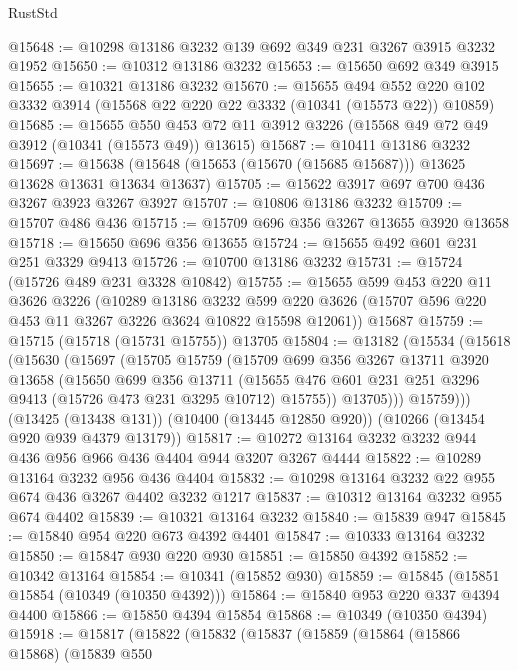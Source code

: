 \begin{lexlean}{RustStd}
\begin{coremodule}
@15648 := @10298 @13186 @3232 @139 @692 @349 @231 @3267 @3915 @3232 @1952
@15650 := @10312 @13186 @3232
@15653 := @15650 @692 @349 @3915
@15655 := @10321 @13186 @3232
@15670 := @15655
    @494
    @552
    @220
    @102
    @3332
    @3914
    (@15568 @22 @220 @22 @3332 (@10341 (@15573 @22)) @10859)
@15685 := @15655
    @550
    @453
    @72
    @11
    @3912
    @3226
    (@15568 @49 @72 @49 @3912 (@10341 (@15573 @49)) @13615)
@15687 := @10411 @13186 @3232
@15697 := @15638 (@15648 (@15653 (@15670 (@15685 @15687))) @13625 @13628 @13631 @13634 @13637)
@15705 := @15622 @3917 @697 @700 @436 @3267 @3923 @3267 @3927
@15707 := @10806 @13186 @3232
@15709 := @15707 @486 @436
@15715 := @15709 @696 @356 @3267 @13655 @3920 @13658
@15718 := @15650 @696 @356 @13655
@15724 := @15655 @492 @601 @231 @251 @3329 @9413
@15726 := @10700 @13186 @3232
@15731 := @15724 (@15726 @489 @231 @3328 @10842)
@15755 := @15655
    @599
    @453
    @220
    @11
    @3626
    @3226
    (@10289
      @13186
      @3232
      @599
      @220
      @3626
      (@15707 @596 @220 @453 @11 @3267 @3226 @3624 @10822 @15598 @12061))
    @15687
@15759 := @15715 (@15718 (@15731 @15755)) @13705
@15804 := @13182
    (@15534
      (@15618
        (@15630
          (@15697
            (@15705
              @15759
              (@15709
                @699
                @356
                @3267
                @13711
                @3920
                @13658
                (@15650
                  @699
                  @356
                  @13711
                  (@15655 @476 @601 @231 @251 @3296 @9413 (@15726 @473 @231 @3295 @10712) @15755))
                @13705)))
          @15759)))
    (@13425 (@13438 @131))
    (@10400 (@13445 @12850 @920))
    (@10266 (@13454 @920 @939 @4379 @13179))
@15817 := @10272 @13164 @3232 @3232 @944 @436 @956 @966 @436 @4404 @944 @3207 @3267 @4444
@15822 := @10289 @13164 @3232 @956 @436 @4404
@15832 := @10298 @13164 @3232 @22 @955 @674 @436 @3267 @4402 @3232 @1217
@15837 := @10312 @13164 @3232 @955 @674 @4402
@15839 := @10321 @13164 @3232
@15840 := @15839 @947
@15845 := @15840 @954 @220 @673 @4392 @4401
@15847 := @10333 @13164 @3232
@15850 := @15847 @930 @220 @930
@15851 := @15850 @4392
@15852 := @10342 @13164
@15854 := @10341 (@15852 @930)
@15859 := @15845 (@15851 @15854 (@10349 (@10350 @4392)))
@15864 := @15840 @953 @220 @337 @4394 @4400
@15866 := @15850 @4394 @15854
@15868 := @10349 (@10350 @4394)
@15918 := @15817
    (@15822
      (@15832
        (@15837
          (@15859
            (@15864
              (@15866 @15868)
              (@15839
                @550

\end{coremodule}
\end{lexlean}
